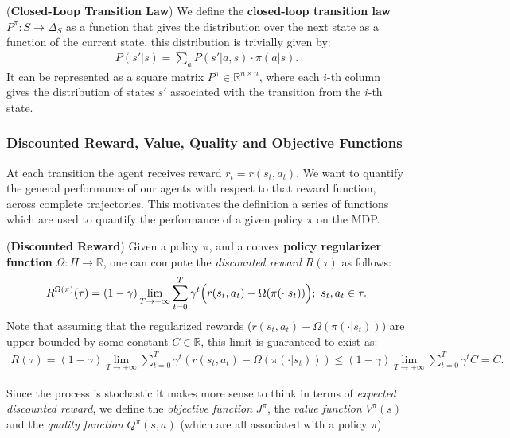 \begin{definition}
    (\textbf{Closed-Loop Transition Law})
    We define the \textbf{closed-loop transition law} $P^\pi :S \rightarrow \Delta_S$ as a function that gives the distribution over the next state as a function of the current state, this distribution is trivially given by: 
    \begin{align*}
        P(s'|s) = \sum_a P(s'|a,s) \cdot \pi(a|s).
    \end{align*}
    \noindent
    It can be represented as a square matrix $P^\pi \in \mathbb{R}^{n \times n}$, where each $i$-th column gives the distribution of states $s'$ associated with the transition from the $i$-th state.
\end{definition}

\subsubsection{Discounted Reward, Value, Quality and Objective Functions}

At each transition the agent receives reward $r_t = r(s_t,a_t)$. We want to quantify the general performance of our agents with respect to that reward function, across complete trajectories. This motivates the definition a series of functions which are used to quantify the performance of a given policy $\pi$ on the MDP. 

\begin{definition}
    (\textbf{Discounted Reward})
    Given a policy $\pi$, and a convex \textbf{policy regularizer function} $\Omega: \Pi \rightarrow \mathbb{R}$, one can compute the \textit{discounted reward} $R(\tau)$ as follows:
    \begin{align*}
        R^{\Omega(\pi)}(\tau) = (1-\gamma) \lim_{T \rightarrow + \infty}\sum_{t=0}^{T} \gamma^t \Bigl( r(s_t,a_t) - \Omega(\pi(\cdot|s_t)) \Bigr) ;~ s_t,a_t \in \tau.
    \end{align*}
    Note that assuming that the regularized rewards ($r(s_t,a_t)- \Omega(\pi(\cdot|s_t))$) are upper-bounded by some constant $C\in \mathbb{R}$, this limit is guaranteed to exist as:
    \begin{align*}
        R(\tau) = (1-\gamma) \lim_{T \rightarrow + \infty}\sum_{t=0}^{T} \gamma^t (r(s_t,a_t)- \Omega(\pi(\cdot|s_t))) \leq (1-\gamma) \lim_{T \rightarrow + \infty}\sum_{t=0}^{T} \gamma^t C = C.
    \end{align*}
\end{definition}
\noindent
Since the process is stochastic it makes more sense to think in terms of \textit{expected discounted reward}, we define the \textit{objective function} $J^\pi$, the \textit{value function} $V^\pi(s)$ and the \textit{quality function} $Q^\pi(s,a)$ (which are all associated with a policy $\pi$).


